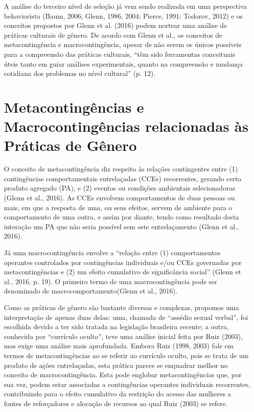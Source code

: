 A análise do terceiro nível de seleção já vem sendo realizada em uma perspectiva behaviorista (Baum, 2006; Glenn, 1986, 2004; Pierce, 1991; Todorov, 2012) e os conceitos propostos por Glenn et al. (2016) podem nortear uma análise de práticas culturais de gênero. De acordo com Glenn et al., os conceitos de metacontingência e macrocontingência, apesar de não serem os únicos possíveis para a compreensão das práticas culturais, “têm sido ferramentas conceituais úteis tanto em guiar análises experimentais, quanto na compreensão e mudança cotidiana dos problemas no nível cultural” (p. 12).

\section*{Metacontingências e Macrocontingências relacionadas às Práticas de Gênero}

O conceito de metacontingência diz respeito às relações contingentes entre (1) contingências comportamentais entrelaçadas (CCEs) recorrentes, gerando certo produto agregado (PA), e (2) eventos ou condições ambientais selecionadoras (Glenn et al., 2016). As CCEs envolvem comportamentos de duas pessoas ou mais, em que a resposta de uma, ou seus efeitos, servem de ambiente para o comportamento de uma outra, e assim por diante, tendo como resultado desta interação um PA que não seria possível sem este entrelaçamento (Glenn et al., 2016). 

Já uma macrocontingência envolve a “relação entre (1) comportamentos operantes controlados por contingências individuais e/ou CCEs governadas por metacontingências e (2) um efeito cumulativo de significância social” (Glenn et al., 2016, p. 19). O primeiro termo de uma macrocontingência pode ser denominado de macrocomportamento\linebreak (Glenn et al., 2016). 

Como as práticas de gênero são bastante diversas e complexas, propomos uma interpretação de apenas duas delas: uma, chamada de “assédio sexual verbal”, foi escolhida devido a ter sido tratada na legislação brasileira recente; a outra, conhecida por “currículo oculto”, teve uma análise inicial feita por Ruiz (2003), mas exige uma análise mais aprofundada. Embora Ruiz (1998, 2003) fale em termos de metacontingências ao se referir ao currículo oculto, pois se trata de um produto de ações entrelaçadas, esta prática parece se enquadrar melhor no conceito de macrocontingência. Esta pode englobar metacontingências que, por sua vez, podem estar associadas a contingências operantes individuais recorrentes, contribuindo para o efeito cumulativo da restrição do acesso das mulheres a fontes de reforçadores e alocação de recursos ao qual Ruiz (2003) se refere.

